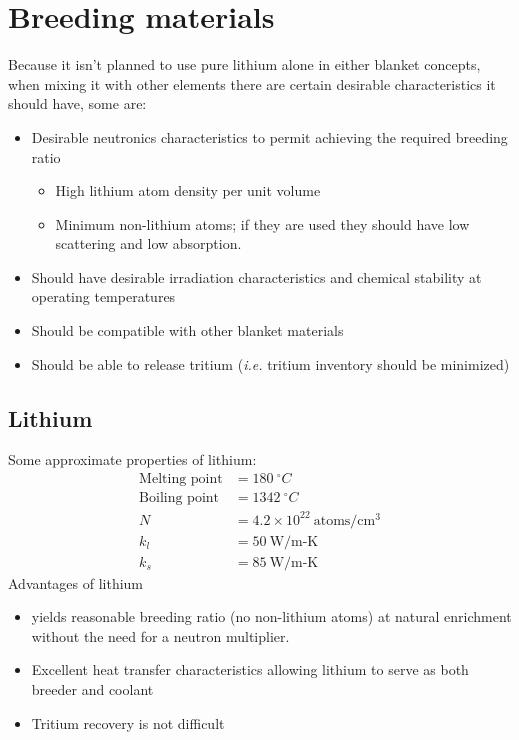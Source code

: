 \documentclass[11pt]{report} %
\begin{document}
\section{Breeding materials}
Because it isn't planned to use pure lithium alone in either blanket concepts, when mixing it with other elements there are certain desirable characteristics it should have, some are:
\begin{itemize}
\item Desirable neutronics characteristics to permit achieving the required breeding ratio
\begin{itemize}
\item High lithium atom density per unit volume
\item Minimum non-lithium atoms; if they are used they should have low scattering and low absorption.
\end{itemize}
\item Should have desirable irradiation characteristics and chemical stability at operating temperatures
\item Should be compatible with other blanket materials
\item Should be able to release tritium ({\it i.e.} tritium inventory should be minimized)
\end{itemize}
\subsection{Lithium}
Some approximate properties of lithium:
\begin{align}
\text{Melting point} & = 180~^\circ C\\
\text{Boiling point} & = 1342~^\circ C\\
N & = 4.2\times10^{22} ~\text{atoms/cm$^3$}\\
k_l & = 50 ~\text{W/m-K}\\
k_s & = 85~\text{W/m-K}
\end{align}
Advantages of lithium
\begin{itemize}
\item yields reasonable breeding ratio (no non-lithium atoms) at natural enrichment without the need for a neutron multiplier.
\item Excellent heat transfer characteristics allowing lithium to serve as both breeder and coolant
\item Tritium recovery is not difficult
\end{itemize}
\end{document}
